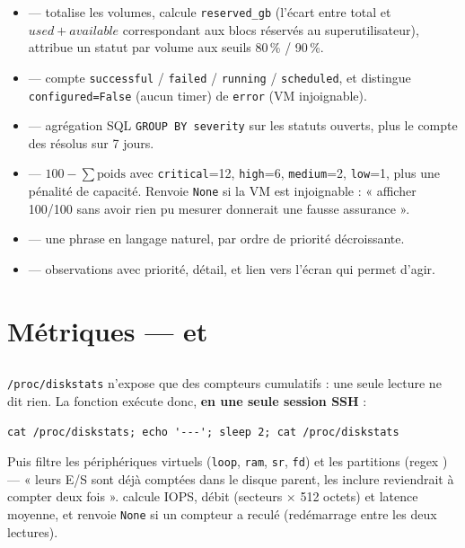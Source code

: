 \begin{itemize}
  \item {} --- totalise les volumes, calcule
  \texttt{reserved\_gb} (l'écart entre total et \(used + available\)
  correspondant aux blocs réservés au superutilisateur), attribue un statut par
  volume aux seuils 80\,\% / 90\,\%.
  \item {} --- compte
  \texttt{successful} / \texttt{failed} / \texttt{running} / \texttt{scheduled},
  et distingue \texttt{configured=False} (aucun timer) de \texttt{error} (VM
  injoignable).
  \item {} --- agrégation SQL \texttt{GROUP BY severity} sur
  les statuts ouverts, plus le compte des résolus sur 7 jours.
  \item {} --- \(100 - \sum \text{poids}\) avec
  \texttt{critical}=12, \texttt{high}=6, \texttt{medium}=2, \texttt{low}=1, plus
  une pénalité de capacité. Renvoie \texttt{None} si la VM est injoignable :
  « afficher 100/100 sans avoir rien pu mesurer donnerait une fausse
  assurance ».
  \item {} --- une phrase en langage naturel, par ordre de priorité
  décroissante.
  \item {} --- observations avec priorité, détail, et lien vers
  l'écran qui permet d'agir.
\end{itemize}

\section{Métriques ---  et }

\subsection*{}
\texttt{/proc/diskstats} n'expose que des compteurs cumulatifs : une seule
lecture ne dit rien. La fonction exécute donc, \textbf{en une seule session
SSH} :

\begin{lstlisting}[caption={La commande réellement envoyée à la VM}]
cat /proc/diskstats; echo '---'; sleep 2; cat /proc/diskstats
\end{lstlisting}

\noindent
Puis  filtre les périphériques virtuels
(\texttt{loop}, \texttt{ram}, \texttt{sr}, \texttt{fd}) et les partitions
(regex ) --- « leurs E/S sont déjà comptées dans le disque
parent, les inclure reviendrait à compter deux fois ».
 calcule IOPS, débit (secteurs \(\times\) 512 octets) et latence
moyenne, et renvoie \texttt{None} si un compteur a reculé (redémarrage entre les
deux lectures).

